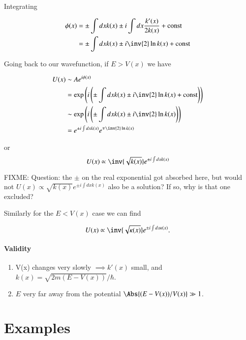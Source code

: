 Integrating

\begin{align*}
\phi(x) 
&= \pm \int dx k(x) \pm i \int dx \frac{k'(x)}{2 k(x)}  + \text{const} \\
&= \pm \int dx k(x) \pm i \inv{2} \ln k(x) + \text{const} 
\end{align*}

Going back to our wavefunction, if $E > V(x)$ we have

\begin{align*}
U(x) 
&\sim A e^{i \phi(x)} \\
&= \exp \left(i\left( 
\pm \int dx k(x) \pm i \inv{2} \ln k(x) + \text{const} 
\right)\right) \\
&\sim \exp \left(i\left( 
\pm \int dx k(x) \pm i \inv{2} \ln k(x) 
\right)\right) \\
&= e^{\pm i \int dx k(x)} e^{\mp \inv{2} \ln k(x)} \\
\end{align*}

or
\begin{equation}\label{eqn:qmTwoL12:350}
U(x) \propto \inv{\sqrt{k(x)}} e^{\pm i \int dx k(x)} 
\end{equation}

FIXME: Question: the $\pm$ on the real exponential got absorbed here, but would not $U(x) \propto \sqrt{k(x)} e^{\pm i \int dx k(x)}$ also be a solution?  If so, why is that one excluded?

Similarly for the $E < V(x)$ case we can find

\begin{equation}\label{eqn:qmTwoL12:370}
U(x) \propto \inv{\sqrt{\kappa(x)}} e^{\pm i \int dx \kappa(x)}.
\end{equation}

\paragraph{Validity}
\begin{enumerate}
\item V(x) changes very slowly $\implies k'(x)$ small, and $k(x) = \sqrt{2 m (E - V(x))}/\hbar$.
\item $E$ very far away from the potential $\Abs{(E - V(x))/V(x)} \gg 1$.
\end{enumerate}

\section{Examples}

